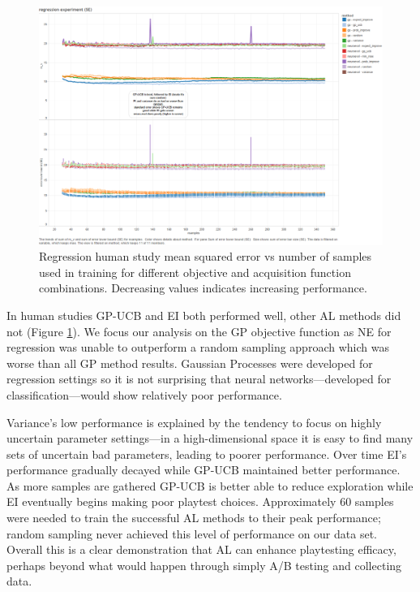 \documentclass{sig-alternate}
\begin{document}
\begin{figure}[tbph]
\centering
\includegraphics[width=\linewidth]{regression_experiment}
\caption{Regression human study mean squared error vs number of samples used in training for different objective and acquisition function combinations. Decreasing values indicates increasing performance.}
\label{fig:reg_expr}
\end{figure}
In human studies GP-UCB and EI both performed well, other AL methods did not (Figure \ref{fig:reg_expr}).
We focus our analysis on the GP objective function as NE for regression was unable to outperform a random sampling approach which was worse than all GP method results.
Gaussian Processes were developed for regression settings so it is not surprising that neural networks---developed for classification---would show relatively poor performance.

Variance's low performance is explained by the tendency to focus on highly uncertain parameter settings---in a high-dimensional space it is easy to find many sets of uncertain bad parameters, leading to poorer performance.
Over time EI's performance gradually decayed while GP-UCB maintained better performance.
As more samples are gathered GP-UCB is better able to reduce exploration while EI eventually begins making poor playtest choices.
Approximately 60 samples were needed to train the successful AL methods to their peak performance; random sampling never achieved this level of performance on our data set.
Overall this is a clear demonstration that AL can enhance playtesting efficacy, perhaps beyond what would happen through simply A/B testing and collecting data.
\end{document}
